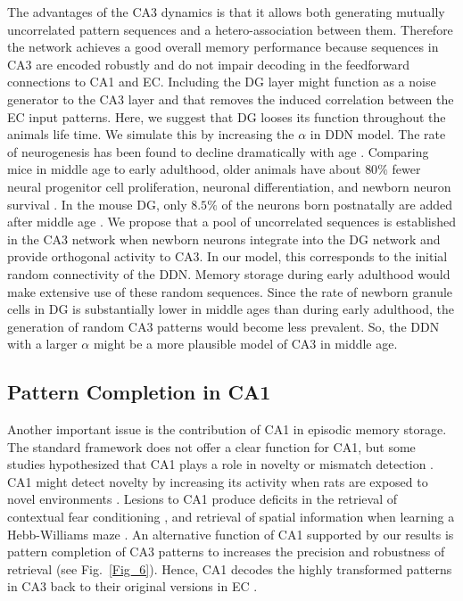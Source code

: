 \documentclass[utf8]{frontiersSCNS} %
\begin{document}
The advantages of the CA3 dynamics is that it allows both generating mutually uncorrelated pattern sequences and a hetero-association between them. Therefore the network achieves a good overall memory performance because sequences in CA3 are encoded robustly and do not impair decoding in the feedforward connections to CA1 and EC. 
%
Including the DG layer might function as a noise generator to the CA3 layer and that removes the induced correlation between the EC input patterns. Here, we suggest that DG looses its function throughout the animals life time. We simulate this by increasing the $\alpha$ in DDN model. 
%
The rate of neurogenesis has been found to decline dramatically with age \citep{ kuhn1996neurogenesis, klempin2007adult}. Comparing mice in middle age to early adulthood, older animals have about $80\%$ fewer neural progenitor cell proliferation, neuronal differentiation, and newborn neuron survival \citep{kuipers2015changes}. In the mouse DG, only $8.5\%$ of the neurons born postnatally are added after middle age \citep{lazic2012modeling}. 
%
We propose that a pool of uncorrelated sequences is established in the CA3 network when newborn neurons integrate into the DG network and provide orthogonal activity to CA3. In our model, this corresponds to the initial random connectivity of the DDN. Memory storage during early adulthood would make extensive use of these random sequences. Since the rate of newborn granule cells in DG is substantially lower in middle ages than during early adulthood, the generation of random CA3 patterns would become less prevalent. So, the DDN with a larger $\alpha$ might be a more plausible model of CA3 in middle age.

\subsection{Pattern Completion in CA1}
Another important issue is the contribution of CA1 in episodic memory storage. The standard framework does not offer a clear function for CA1, but some studies hypothesized that CA1 plays a role in novelty or mismatch detection \citep{hasselmo1996encoding, lisman2001storage}. CA1 might detect novelty by increasing its activity when rats are exposed to novel environments \citep{karlsson2008network, csicsvari2007place}.
%
Lesions to CA1 produce deficits in the retrieval of contextual fear conditioning \citep{lee2004differential}, and retrieval of spatial information when learning a Hebb-Williams maze \citep{jerman2006disconnection, vago2007role, hunsaker2008double}. 
%
An alternative function of CA1 supported by our results is pattern completion of CA3 patterns to increases the precision and robustness of retrieval (see Fig.~\ref{Fig_6}). Hence, CA1 decodes the highly transformed patterns in CA3 back to their original versions in EC \citep{neher2015memory}.
\end{document}
